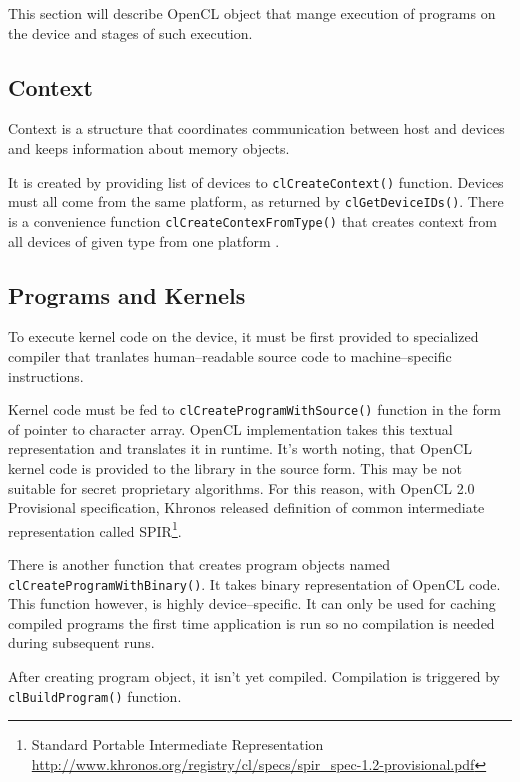 This section will describe OpenCL object that mange execution of programs on the
device and stages of such execution.

\subsection{Context}

Context is a structure that coordinates communication between host and devices
and keeps information about memory objects. 

It is created by providing list of devices to \texttt{clCreateContext()}
function. Devices must all come from the same platform, as returned by
\texttt{clGetDeviceIDs()}. There is a convenience function \texttt{clCreate\-Contex\-FromType()}
that creates context from all devices of given type from one platform \parencite{openclspec}.

\subsection{Programs and Kernels}

To execute kernel code on the device, it must be first provided to specialized
compiler that tranlates human--readable source code to machine--specific
instructions.

Kernel code must be fed to \texttt{clCreate\-Program\-WithSource()} function in the form of
pointer to character array. OpenCL implementation takes this textual
representation and translates it in runtime. It's worth noting, that OpenCL kernel
code is provided to the library in the source form. This may be not suitable for
secret proprietary algorithms. For this reason, with OpenCL 2.0 Provisional
specification, Khronos released definition of common intermediate
representation called SPIR\footnote{Standard Portable Intermediate Representation
  \url{http://www.khronos.org/registry/cl/specs/spir_spec-1.2-provisional.pdf}}.

There is another function that creates program objects named\\
\texttt{clCreate\-Program\-With\-Binary()}. It takes binary representation of OpenCL
code. This function however, is highly device--specific. It can only be used
for caching compiled programs the first time application is run so no compilation
is needed during subsequent runs.

After creating program object, it isn't yet compiled. Compilation is triggered
by \texttt{cl\-Build\-Program()} function.

